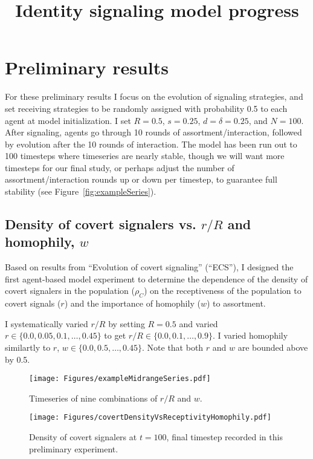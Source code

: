 \documentclass[11pt,letterpaper]{article}
\title{Identity signaling model progress}
\author{} %
\begin{document}
\maketitle

\section*{Preliminary results}

For these preliminary results I focus on the evolution of signaling strategies,
and set receiving strategies to be randomly assigned with probability 0.5 to
each agent at model initialization. I set $R=0.5$, $s=0.25$, $d=\delta=0.25$,
and $N=100$. After signaling, agents go through 10 rounds of assortment/interaction,
followed by evolution after the 10 rounds of interaction. The model has been
run out to 100 timesteps where timeseries are nearly stable, though we will
want more timesteps for our final study, or perhaps adjust the number of 
assortment/interaction rounds up or down per timestep, to guarantee full 
stability (see Figure~\ref{fig:exampleSeries}).

\subsection*{Density of covert signalers vs. $r/R$ and homophily, $w$}

Based on results from ``Evolution of covert signaling'' (``ECS''), I designed
the first agent-based model experiment to determine the dependence of the
density of covert signalers in the population ($\rho_C$) on
the receptiveness of the population to covert signals ($r$) and the
importance of homophily ($w$) to assortment. 

I systematically varied $r/R$ by setting $R=0.5$ and varied 
$r \in \{0.0, 0.05, 0.1, \ldots, 0.45\}$ to get $r/R \in \{0.0, 0.1, \ldots, 0.9\}$.
I varied homophily similartly to $r$, $w \in \{0.0, 0.5, \ldots, 0.45\}$. Note
that both $r$ and $w$ are bounded above by 0.5.


\begin{figure}[H]
  \centering
  \texttt{[image: Figures/exampleMidrangeSeries.pdf]}
  \caption{Timeseries of nine combinations of $r/R$ and $w$.}
  \label{fig:receptivityHomophilySeries}
\end{figure}


\begin{figure}[H]
  \centering
\texttt{[image: Figures/covertDensityVsReceptivityHomophily.pdf]}
  \caption{Density of covert signalers at $t=100$, final timestep recorded
    in this preliminary experiment.}
  \label{fig:receptivityHomophilyHeatmap}
\end{figure}
\end{document}
